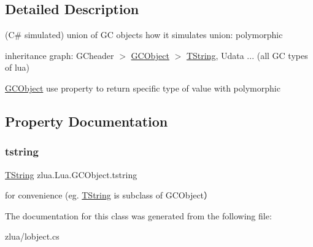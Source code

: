 \subsection{Detailed Description}
(C\# simulated) union of GC objects how it simulates union\+: polymorphic 


\begin{DoxyEnumerate}
\item inheritance graph\+: G\+Cheader $>$ \mbox{\hyperlink{classzlua_1_1_lua_1_1_g_c_object}{G\+C\+Object}} $>$ \mbox{\hyperlink{classzlua_1_1_lua_1_1_t_string}{T\+String}}, Udata ... (all GC types of lua)
\item \mbox{\hyperlink{classzlua_1_1_lua_1_1_g_c_object}{G\+C\+Object}} use property to return specific type of value with polymorphic 
\end{DoxyEnumerate}

\subsection{Property Documentation}
\mbox{\label{classzlua_1_1_lua_1_1_g_c_object_adb3aafad7ab9791defdd09ddb5f56d64}} 
\subsubsection{\texorpdfstring{tstring}{tstring}}
{\footnotesize\ttfamily \mbox{\hyperlink{classzlua_1_1_lua_1_1_t_string}{T\+String}} zlua.\+Lua.\+G\+C\+Object.\+tstring\hspace{0.3cm}{\ttfamily [get]}}



for convenience (eg. \mbox{\hyperlink{classzlua_1_1_lua_1_1_t_string}{T\+String}} is subclass of G\+C\+Object） 



The documentation for this class was generated from the following file\+:\begin{DoxyCompactItemize}
\item 
zlua/lobject.\+cs\end{DoxyCompactItemize}
